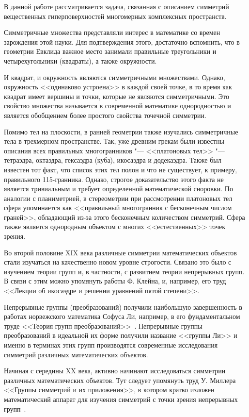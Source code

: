 \documentclass[../main.tex]{subfiles}
\begin{document}
В данной работе рассматривается задача, связанная с описанием симметрий вещественных гиперповерхностей многомерных комплексных пространств.

Симметричные множества представляли интерес в математике со времен зарождения этой науки. Для подтверждения этого, достаточно вспомнить, что в геометрии Евклида важное место занимали правильные треугольники и четырехугольники (квадраты), а также окружности.

И квадрат, и окружность являются симметричными множествами. Однако, окружность <<одинаково устроена>> в каждой своей точке, в то время как квадрат имеет вершины и точки, которые не являются симметричными. Это свойство множества называется в современной математике однородностью и является обобщением более простого свойства точечной симметрии.

Помимо тел на плоскости, в ранней геометрии также изучались симметричные тела в трехмерном пространстве. Так, уже древним грекам были известны описания всех правильных многогранников "--- <<платоновых тел>> "--- тетраэдра, октаэдра, гексаэдра (куба), икосаэдра и додекаэдра. Также был известен тот факт, что список этих тел полон и что не существует, к примеру, правильного 115-гранника. Однако, строгое доказательство этого факта не является тривиальным и требует определенной математической сноровки. По аналогии с планиметрией, в стереометрии при рассмотрении платоновых тел сфера упоминается как <<правильный многогранник с бесконечным числом граней>>, обладающий из-за этого бесконечным количеством симметрий. Сфера также является однородным объектом с многих <<естественных>> точек зрения.

Во второй половине XIX века различные симметрии математических объектов стали изучаться на качественно новом уровне строгости. Связано это было с изучением теории групп и, в частности, с развитием теории непрерывных групп. В связи с этим можно упомянуть работы Ф. Клейна, и, например, его труд <<Лекции об икосаэдре и решении уравнений пятой степени>>.

Непрерывные группы (преобразований) получили наибольшую завершенность в работах норвежского математика Софуса Ли, например, в его фундаментальном труде <<Теория групп преобразований>>~\cite{lie}. Непрерывные группы преобразований в идеальной их форме получили название <<группы Ли>> и именно в терминах этих групп производятся современные исследования симметрий различных математических объектов.

Начиная с середины XX века, активно начинают исследоваться симметрии различных математических объектов. Тут следует упомянуть труд У. Миллера <<Группы симметрий и их приложения>>, в котором кратко изложен математический аппарат для изучения симметрий с точки зрения непрерывных групп~\cite{miller1973symmetry}.
\end{document}
